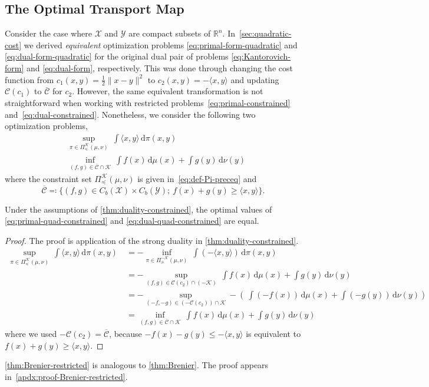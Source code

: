 \documentclass[10pt]{article}
\newcommand{\ud}{\,\mathrm{d}}
\newcommand{\norm}[1]{\|#1\|}
\newcommand{\real}{\mathbb{R}}
\newcommand{\calC}{\mathcal{C}}
\newcommand{\calK}{\mathcal{K}}
\newcommand{\calX}{\mathcal{X}}
\newcommand{\calY}{\mathcal{Y}}
\numberwithin{equation}{section}
\begin{document}
\subsection{The Optimal Transport Map}\label{apdx:conic-qaudratic}
Consider the case where $\calX$ and $\calY$ are compact subsets of $\real^n$. 
In~\autoref{sec:quadratic-cost} we derived {\em equivalent} optimization problems \eqref{eq:primal-form-quadratic} and \eqref{eq:dual-form-quadratic} for the original dual pair of problems \eqref{eq:Kantorovich-form} and \eqref{eq:dual-form}, respectively. This was done through changing the cost function from $c_1(x,y) =\frac{1}{2} \norm{x-y}^2$ to $c_2(x,y) =- \langle x, y\rangle$ and updating $\calC(c_1)$ to $\overline{\calC}$ for $c_2$. However, the same equivalent transformation is not straightforward when working with restricted problems~\eqref{eq:primal-constrained} and~\eqref{eq:dual-constrained}. Nonetheless, we consider the following two optimization problems, 
\begin{align}
	&\sup_{\pi \in \Pi_\preceq^\calK(\mu,\nu)} ~\int \langle x, y\rangle\ud\pi(x,y)\label{eq:primal-quad-constrained}\\
	&\inf_{(f,g)\in \overline{\calC}\cap \calK} ~\int f(x)\ud \mu(x) + \int g(y)\ud \nu(y)\label{eq:dual-quad-constrained}
\end{align} 
where the constraint set $\Pi_\preceq^\calK(\mu,\nu)$ is given in~\eqref{eq:def-Pi-preceq} and 
\begin{equation*}
\overline{\calC} \eqqcolon \{(f,g) \in C_b(\calX) \times C_b(\calY);~f(x)+g(y)\geq \langle x,y \rangle\}.
\end{equation*} 
\begin{theorem}\label{thm:restricted-duality}
Under the assumptions of \autoref{thm:duality-constrained}, the optimal values of \eqref{eq:primal-quad-constrained} and \eqref{eq:dual-quad-constrained} are equal. 
\end{theorem}
\begin{proof}
The proof is application of the strong duality in \autoref{thm:duality-constrained}. 
\begin{align*}
\sup_{\pi \in \Pi_\preceq^\calK(\mu,\nu)} ~\int \langle x, y\rangle\ud\pi(x,y)~&=
-\inf_{\pi \in \Pi_\succeq^{-\calK}(\mu,\nu)} ~\int (-\langle x, y\rangle)\ud\pi(x,y)\\
&=	 - \sup_{(f,g)\in{\calC(c_2)}\cap (-\calK)} ~\int f(x)\ud \mu(x) + \int g(y)\ud \nu(y)\\
&= - \sup_{(-f,-g)\in (-\calC(c_2))\cap \calK} -\left(~\int (-f(x))\ud \mu(x) + \int (-g(y))\ud \nu(y)\right)\\
&=\inf_{(f,g)\in \overline{\calC}\cap \calK} ~\int f(x)\ud \mu(x) + \int g(y)\ud \nu(y)
\end{align*}
where we used $-\calC(c_2) = \overline{\calC}$, because $-f(x) -g(y)\leq -\langle x,y \rangle$ is equivalent to $f(x)+g(y)\geq \langle x,y \rangle$.
\end{proof}
\autoref{thm:Brenier-restricted} is analogous to \autoref{thm:Brenier}. The proof appears in~\autoref{apdx:proof-Brenier-restricted}.
\end{document}
